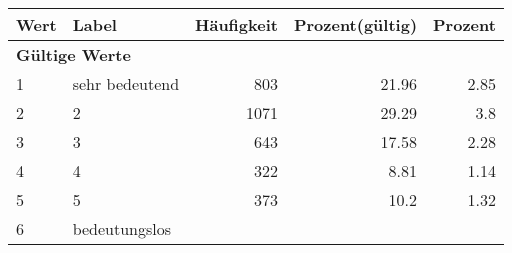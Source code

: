      \begin{longtable}{lXrrr}
     \toprule
     \textbf{Wert} & \textbf{Label} & \textbf{Häufigkeit} & \textbf{Prozent(gültig)} & \textbf{Prozent} \\
     \endhead
     \midrule
     \multicolumn{5}{l}{\textbf{Gültige Werte}}\\

     1 &
     \multicolumn{1}{X}{ sehr bedeutend   } &


       \num{803} &
       \num[round-mode=places,round-precision=2]{21,96} &
         \num[round-mode=places,round-precision=2]{2,85} \\

     2 &
     \multicolumn{1}{X}{ 2   } &


       \num{1071} &
       \num[round-mode=places,round-precision=2]{29,29} &
         \num[round-mode=places,round-precision=2]{3,8} \\

     3 &
     \multicolumn{1}{X}{ 3   } &


       \num{643} &
       \num[round-mode=places,round-precision=2]{17,58} &
         \num[round-mode=places,round-precision=2]{2,28} \\

     4 &
     \multicolumn{1}{X}{ 4   } &


       \num{322} &
       \num[round-mode=places,round-precision=2]{8,81} &
         \num[round-mode=places,round-precision=2]{1,14} \\

     5 &
     \multicolumn{1}{X}{ 5   } &


       \num{373} &
       \num[round-mode=places,round-precision=2]{10,2} &
         \num[round-mode=places,round-precision=2]{1,32} \\

     6 &
     \multicolumn{1}{X}{ bedeutungslos   } &



\end{longtable}
